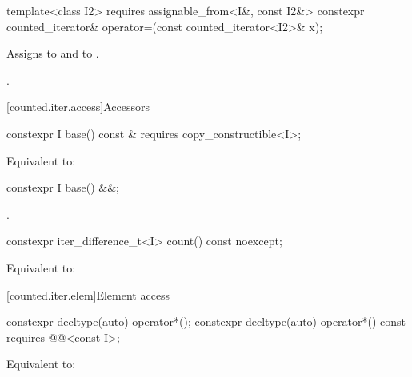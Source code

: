 %
\begin{itemdecl}
template<class I2>
  requires assignable_from<I&, const I2&>
    constexpr counted_iterator& operator=(const counted_iterator<I2>& x);
\end{itemdecl}

\begin{itemdescr}
\pnum
\effects
Assigns  to  and
 to .

\pnum
\returns
{}.
\end{itemdescr}

[counted.iter.access]{Accessors}

%
\begin{itemdecl}
constexpr I base() const & requires copy_constructible<I>;
\end{itemdecl}

\begin{itemdescr}
\pnum
\effects
Equivalent to: 
\end{itemdescr}

%
\begin{itemdecl}
constexpr I base() &&;
\end{itemdecl}

\begin{itemdescr}
\pnum
\returns
{}.
\end{itemdescr}

%
\begin{itemdecl}
constexpr iter_difference_t<I> count() const noexcept;
\end{itemdecl}

\begin{itemdescr}
\pnum
\effects
Equivalent to: 
\end{itemdescr}

[counted.iter.elem]{Element access}

%
\begin{itemdecl}
constexpr decltype(auto) operator*();
constexpr decltype(auto) operator*() const
  requires @@<const I>;
\end{itemdecl}

\begin{itemdescr}
\pnum
\effects
Equivalent to: 
\end{itemdescr}

